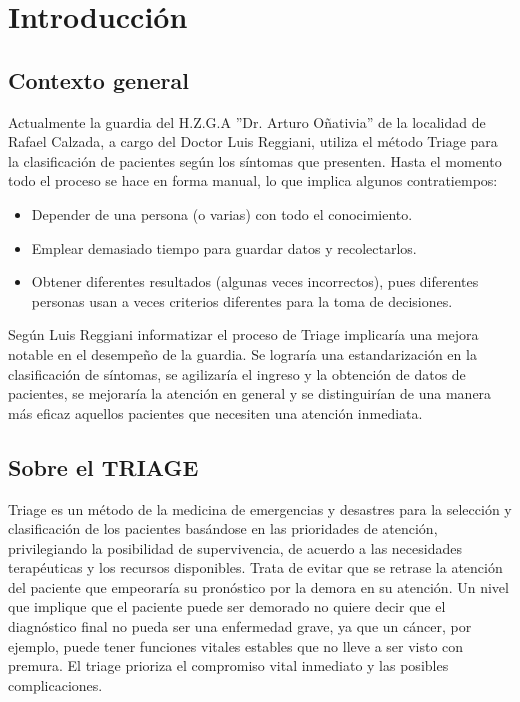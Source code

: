 \section{Introducción}
\subsection{Contexto general}
Actualmente la guardia del H.Z.G.A ''Dr. Arturo Oñativia'' de la localidad de Rafael Calzada, a cargo del Doctor Luis Reggiani, utiliza el método Triage \cite{Derlet,Manual} para la clasificación de pacientes según los síntomas que presenten. Hasta el momento todo el proceso se hace en forma manual, lo que implica algunos contratiempos:
\begin{itemize}
\item Depender de una persona (o varias) con todo el conocimiento.
\item Emplear demasiado tiempo para guardar datos y recolectarlos.
\item Obtener diferentes resultados (algunas veces incorrectos), pues diferentes personas usan a veces criterios diferentes para la toma de decisiones.
\end{itemize}
Según Luis Reggiani informatizar el proceso de Triage implicaría una mejora notable en el desempeño de la guardia. Se lograría una estandarización en la clasificación de síntomas, se agilizaría el ingreso y la obtención de datos de pacientes, se mejoraría la atención en general y se distinguirían de una manera más eficaz aquellos pacientes que necesiten una atención inmediata.
\subsection{Sobre el TRIAGE}
Triage es un método de la medicina de emergencias y desastres para la selección y clasificación de los pacientes basándose en las prioridades de atención, privilegiando la posibilidad de supervivencia, de acuerdo a las necesidades terapéuticas y los recursos disponibles. Trata de evitar que se retrase la atención del paciente que empeoraría su pronóstico por la demora en su atención. Un nivel que implique que el paciente puede ser demorado no quiere decir que el diagnóstico final no pueda ser una enfermedad grave, ya que un cáncer, por ejemplo, puede tener funciones vitales estables que no lleve a ser visto con premura. El triage prioriza el compromiso vital inmediato y las posibles complicaciones.
